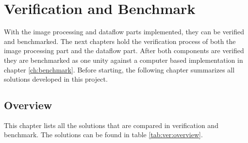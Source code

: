%
%
\chapter{Verification and Benchmark} \label{chapt:ver_bench}
With the image processing and dataflow parts implemented, they can be verified
and benchmarked. The next chapters hold the verification process of both the
image processing part and the dataflow part. After both components are verified
they are benchmarked as one unity against a computer based implementation in
chapter \ref{ch:benchmark}. Before starting, the following chapter summarizes
all solutions developed in this project.

%
%
\section{Overview} \label{ch:overview}
This chapter lists all the solutions that are compared in verification and benchmark. The solutions can be found in table \ref{tab:ver:overview}.

